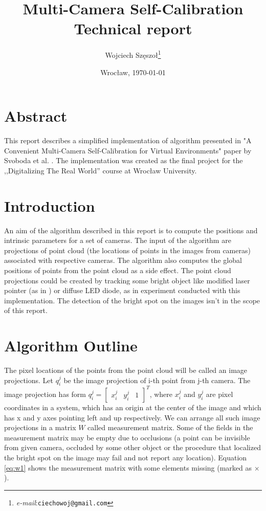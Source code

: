 \documentclass[12pt]{article}
\title{\textbf{Multi-Camera Self-Calibration}\\{\large Technical report}}
\author{Wojciech Szęszoł\thanks{\textit{e-mail}:\texttt{ciechowoj@gmail.com}}}
\date{Wrocław, \today}
\begin{document}
\maketitle


\thispagestyle{empty}
\newpage

\section{Abstract}
This report describes a simplified implementation of algorithm presented in "A Convenient Multi-Camera
Self-Calibration for Virtual
Environments" paper by Svoboda et al. \cite{svoboda05}. The implementation was created as the final project for the ,,Digitalizing The Real World'' course at Wrocław University.


\section{Introduction}
An aim of the algorithm described in this report is to compute the positions and intrinsic parameters for a set of cameras. The input of the algorithm are projections of point cloud (the locations of points in the images from cameras) associated with respective cameras. The algorithm also computes the global positions of points from the point cloud as a side effect. The point cloud projections could be created by tracking some bright object like modified laser pointer (as in \cite{svoboda05}) or diffuse LED diode, as in experiment conducted with this implementation. The detection of the bright spot on the images isn't in the scope of this report.

\section{Algorithm Outline}

The pixel locations of the points from the point cloud will be called an image projections. Let $q_i^j$ be the image projection of i-th point from j-th camera. The image projection has form $q_i^j = \begin{bmatrix} x_i^j & y_i^j & 1 \end{bmatrix}^T$, where $x_i^j$ and $y_i^j$ are pixel coordinates in a system, which has an origin at the center of the image and which has x and y axes pointing left and up respectively. We can arrange all such image projections in a matrix $W$ called measurement matrix. Some of the fields in the measurement matrix may be empty due to occlusions (a point can be invisible from given camera, occluded by some other object or the procedure that localized the bright spot on the image may fail and not report any location). Equation \ref{eq:w1} shows the measurement matrix with some elements missing (marked as $\times$).
\end{document}
